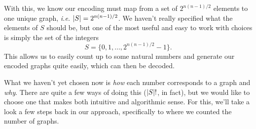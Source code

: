 
With this, we know our encoding must map from a set of \( 2^{n \left( n - 1
\right) / 2} \) elements to one unique graph, \textit{i.e.} \( \left\lvert S \right\rvert = 2^{n
\left( n - 1 \right) / 2} \). We haven't really specified what the elements of
\( S \) should be, but one of the most useful and easy to work with choices is
simply the set of the integers 
\[
    S = \{0, 1, \ldots, 2^{n \left( n - 1 \right) / 2} - 1 \}
.\]
This allows us to easily count up to some natural numbers and generate our
encoded graphs quite easily, which can then be decoded.

What we haven't yet chosen now is \textit{how} each number corresponds to a
graph and \textit{why}. There are quite a few ways of doing this (\( \left\lvert S \right\rvert!
\), in fact), but we would like to choose one that makes both intuitive and
algorithmic sense. For this, we'll take a look a few steps back in our
approach, specifically to where we counted the number of graphs.

